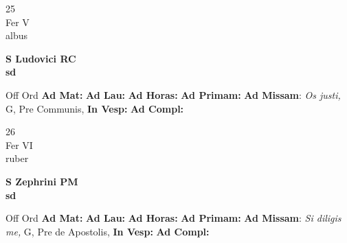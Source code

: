 \documentclass[10pt, openany]{book}
\begin{document}
    \begin{center}
        \begin{minipage}{3.5in}
            \vspace{2em}
            \begin{minipage}{0.5in}
                {\Huge 25} \\
                {\normalsize Fer V} \\
                {\normalsize albus}
            \end{minipage}
            \begin{minipage}{3.0in}
                \textbf{ \large S Ludovici RC \\
                \textnormal{\normalsize sd}} \\ 
            \end{minipage}
            \begin{justify}Off Ord
                \textbf{Ad Mat: }
                \textbf{Ad Lau: }
                \textbf{Ad Horas: }
                \textbf{Ad Primam: }\textbf{Ad Missam}: \textit{Os justi,} G, Pre Communis,  
                \textbf{In Vesp: }
                \textbf{Ad Compl: }
            \end{justify}
        \end{minipage}
    \end{center}

    \begin{center}
        \begin{minipage}{3.5in}
            \vspace{2em}
            \begin{minipage}{0.5in}
                {\Huge 26} \\
                {\normalsize Fer VI} \\
                {\normalsize ruber}
            \end{minipage}
            \begin{minipage}{3.0in}
                \textbf{ \large S Zephrini PM \\
                \textnormal{\normalsize sd}} \\ 
            \end{minipage}
            \begin{justify}Off Ord
                \textbf{Ad Mat: }
                \textbf{Ad Lau: }
                \textbf{Ad Horas: }
                \textbf{Ad Primam: }\textbf{Ad Missam}: \textit{Si diligis me,} G, Pre de Apostolis,  
                \textbf{In Vesp: }
                \textbf{Ad Compl: }
            \end{justify}
        \end{minipage}
    \end{center}
\end{document}
